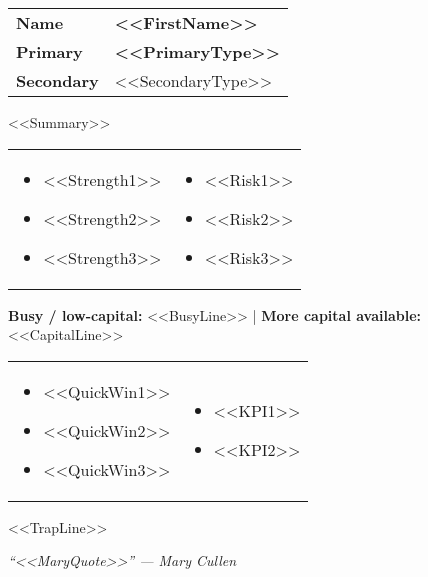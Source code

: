 \begin{tabularx}{\linewidth}{@{} l Y @{}}
\textbf{Name} & \textbf{<<FirstName>>} \\
\textbf{Primary} & \textbf{<<PrimaryType>>} \\
\textbf{Secondary} & <<SecondaryType>> \\
\end{tabularx}

{\small <<Summary>>}

\begin{tabularx}{\linewidth}{@{} Y Y @{}}
\begin{itemize}
  \item <<Strength1>>
  \item <<Strength2>>
  \item <<Strength3>>
\end{itemize}
&
\begin{itemize}
  \item <<Risk1>>
  \item <<Risk2>>
  \item <<Risk3>>
\end{itemize}
\end{tabularx}

{\small \textbf{Busy / low-capital:} <<BusyLine>> \quad | \quad \textbf{More capital available:} <<CapitalLine>>}

\begin{tabularx}{\linewidth}{@{} Y Y @{}}
\begin{itemize}
  \item <<QuickWin1>>
  \item <<QuickWin2>>
  \item <<QuickWin3>>
\end{itemize}
&
\begin{itemize}
  \item <<KPI1>>
  \item <<KPI2>>
\end{itemize}
\end{tabularx}

{\small <<TrapLine>>}

\emph{“<<MaryQuote>>” — Mary Cullen}

